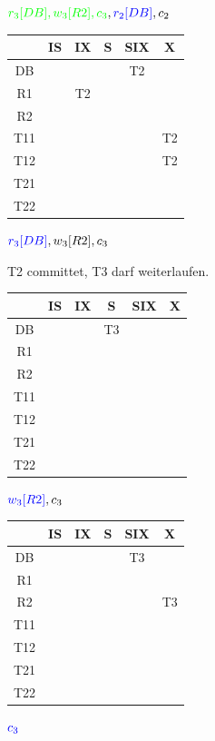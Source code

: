 \begin{note}
\begin{enumerate}[a)]
$\textcolor{green}{r_3[DB], w_3[R2], c_3}, \textcolor{blue}{r_2[DB]}, c_2$

\begin{tabular}{|c|c|c|c|c|c|}
	\hline
	& IS & IX & S & SIX & X \\
	\hline
	DB & & &  & T2 &  \\
	\hline
	R1 &  & T2 &  &  &  \\
	\hline
	R2 &  &  &  &  &  \\
	\hline
	T11 &  &  &  &  & T2 \\
	\hline
	T12 &  &  &  &  & T2 \\
	\hline
	T21 &  &  &  &  &  \\
	\hline
	T22 &  &  &  &  &  \\
	\hline
\end{tabular}

$\textcolor{blue}{r_3[DB]}, w_3[R2], c_3$

T2 committet, T3 darf weiterlaufen.

\begin{tabular}{|c|c|c|c|c|c|}
	\hline
	& IS & IX & S & SIX & X \\
	\hline
	DB &  &  & T3 &  &  \\
	\hline
	R1 &  &  &  &  &  \\
	\hline
	R2 &  &  &  &  &  \\
	\hline
	T11 &  &  &  &  &  \\
	\hline
	T12 &  &  &  &  &  \\
	\hline
	T21 &  &  &  &  &  \\
	\hline
	T22 &  &  &  &  &  \\
	\hline
\end{tabular}

$\textcolor{blue}{w_3[R2]}, c_3$

\begin{tabular}{|c|c|c|c|c|c|}
	\hline
	& IS & IX & S & SIX & X \\
	\hline
	DB &  &  &  & T3 &  \\
	\hline
	R1 &  &  &  &  &  \\
	\hline
	R2 &  &  &  &  & T3 \\
	\hline
	T11 &  &  &  &  &  \\
	\hline
	T12 &  &  &  &  &  \\
	\hline
	T21 &  &  &  &  &  \\
	\hline
	T22 &  &  &  &  &  \\
	\hline
\end{tabular}

$\textcolor{blue}{c_3}$


\end{enumerate}
\end{note}

